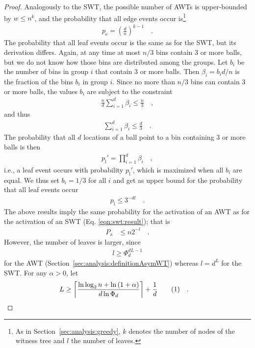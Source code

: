 \documentclass[a4paper,12pt]{article}
\newcommand\numberthis{\addtocounter{equation}{1}\tag{\theequation}}
\newcommand\neqn[1]{\numberthis\label{eqn:#1}}
\begin{document}
\begin{proof}
Analogously to the SWT, the possible number of AWTs is upper-bounded by $w\leq	n^k$, and the probability that all edge events occur is\footnote{As in Section~\ref{sec:analysis:greedy}, $k$ denotes the number of nodes of the witness tree and $l$ the number of leaves.} 
\begin{align*}
p_\mathrm{e} = \left(\frac{d}{n}\right)^{k-1}\quad .
\end{align*}
The probability that all leaf events occur is the same as for the SWT, but its derivation differs. Again, at any time at most $n/3$ bins contain 3 or more balls, but we do not know how those bins are distributed among the groups. Let $b_i$ be the number of bins in group $i$ that contain 3 or more balls. Then $\beta_i = b_i d/ n$ is the fraction of the bins $b_i$ in group $i$. Since no more than $n/3$ bins can contain 3 or more balls, the values $b_i$ are subject to the constraint
\begin{align*}
\frac{n}{d}\sum_{i=1}^d \beta_i \leq \frac{n}{3}\quad ,
\end{align*}
and thus 
\begin{align*}
\sum_{i=1}^d \beta_i \leq \frac{d}{3}\quad .
\end{align*}
The probability that all $d$ locations of a ball point to a bin containing 3 or more balls is then 
\begin{align*}
p_\mathrm{l}' = \prod_{i=1}^{d} \beta_i \quad ,
\end{align*}
i.e., a leaf event occurs with probability $p_\mathrm{l}'$, which is maximized when all $b_i$ are equal. We thus set $b_i = 1/3$ for all $i$ and get as upper bound for the probability that all leaf events occur 
\begin{align*}
p_\mathrm{l} \leq 3^{-d l}\quad .
\end{align*}
The above results imply the same probability for the activation of an AWT as for the activation of an SWT (Eq. \ref{eqn:swt:result}); that is
\begin{align*}
P_\mathrm{a} &\leq n  2^{-l}\quad .
\end{align*}
However, the number of leaves is larger, since 
\begin{align*}
l \geq \Phi_d^{d L -1}
\end{align*}
for the AWT (Section~\ref{sec:analysis:definitionAsymWT}) whereas $l = d^L$ for the SWT.
For any $\alpha > 0$, let 
\begin{align*}
L &\geq \left\lceil{\frac{\ln\log_2 n + \ln\left(1+\alpha\right)}{d \ln \Phi_d}}\right\rceil+\frac{1}{d} \neqn{awt:chooseL}\quad .

\end{align*}
\end{proof}
\end{document}
